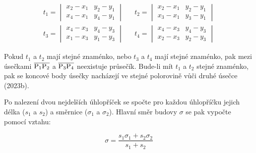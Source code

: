 \begin{equation} 
\begin{aligned}
            t_1 = \begin{vmatrix} x_2 - x_1 & y_2 - y_1 \\ x_4 - x_1 & y_4 - y_1  \end{vmatrix} &&
            t_2 = \begin{vmatrix} x_2 - x_1 & y_2 - y_1 \\ x_3 - x_1 & y_3 - y_1  \end{vmatrix} \\
            t_3 = \begin{vmatrix} x_4 - x_3 & y_4 - y_3 \\ x_1 - x_3 & y_1 - y_3  \end{vmatrix} &&
            t_4 = \begin{vmatrix} x_4 - x_3 & y_4 - y_3 \\ x_2 - x_3 & y_2 - y_3 \end{vmatrix}
\end{aligned}
\end{equation}

\par Pokud $t_1$ a $t_2$ mají stejné znaménko, nebo $t_3$ a $t_4$ mají stejné znaménko, pak mezi úsečkami $\overline{\rm P_1P_2}$ a $\overline{\rm P_3P_4}$ neexistuje průsečík. Bude-li mít $t_1$ a $t_2$ stejné znaménko, pak se koncové body úsečky nacházejí ve stejné polorovině vůči druhé úsečce (2023b).

\par Po nalezení dvou nejdelších úhlopříček se spočte pro každou úhlopříčku jejich délka ($s_1$ a $s_2$) a směrnice ($\sigma_1$ a $\sigma_2$). Hlavní směr budovy $\sigma$ se pak vypočte pomocí vztahu:

\begin{equation} 
    \sigma = \frac{s_1\sigma_1 + s_2\sigma_2}{s_1 + s_2}
\end{equation} 

\newpage

